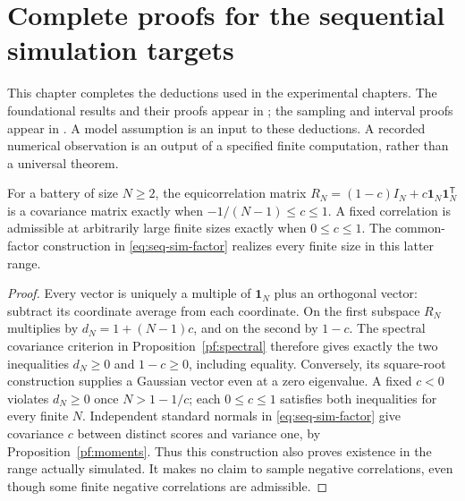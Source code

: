 \chapter{Complete proofs for the sequential simulation targets}
\label{sec:seq-proof-completion}

This chapter completes the deductions used in the experimental chapters.
The foundational results and their proofs appear in
; the sampling and interval proofs appear
in . A model assumption is an
input to these deductions. A recorded numerical observation is an output
of a specified finite computation, rather than a universal theorem.

\begin{proposition}
\label{seqp:domain}
For a battery of size \(N\geq2\), the equicorrelation matrix
\(R_N=(1-c)I_N+c\mathbf1_N\mathbf1_N^{\mathsf T}\) is a covariance
matrix exactly when \(-1/(N-1)\leq c\leq1\). A fixed correlation is
admissible at arbitrarily large finite sizes exactly when \(0\leq c\leq1\).
The common-factor construction in \eqref{eq:seq-sim-factor} realizes every
finite size in this latter range.
\end{proposition}
\begin{proof}
Every vector is uniquely a multiple of \(\mathbf1_N\) plus an orthogonal
vector: subtract its coordinate average from each coordinate. On the first
subspace \(R_N\) multiplies by \(d_N=1+(N-1)c\), and on the second by
\(1-c\). The spectral covariance criterion in
Proposition~\ref{pf:spectral} therefore gives exactly the two inequalities
\(d_N\geq0\) and \(1-c\geq0\), including equality. Conversely, its
square-root construction supplies a Gaussian vector even at a zero
eigenvalue. A fixed \(c<0\) violates \(d_N\geq0\) once
\(N>1-1/c\); each \(0\leq c\leq1\) satisfies both inequalities for
every finite \(N\). Independent standard normals in
\eqref{eq:seq-sim-factor} give covariance \(c\) between distinct scores
and variance one, by Proposition~\ref{pf:moments}. Thus this construction
also proves existence in the range actually simulated. It makes no claim
to sample negative correlations, even though some finite negative
correlations are admissible.
\end{proof}

